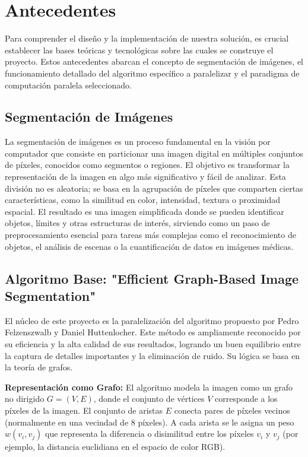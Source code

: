 \documentclass[fleqn,10pt]{article}
\begin{document}
\section{Antecedentes}
Para comprender el diseño y la implementación de nuestra solución, es crucial establecer las bases teóricas y tecnológicas sobre las cuales se construye el proyecto. Estos antecedentes abarcan el concepto de segmentación de imágenes, el funcionamiento detallado del algoritmo específico a paralelizar y el paradigma de computación paralela seleccionado.

\subsection{Segmentación de Imágenes}
La segmentación de imágenes es un proceso fundamental en la visión por computador que consiste en particionar una imagen digital en múltiples conjuntos de píxeles, conocidos como segmentos o regiones. El objetivo es transformar la representación de la imagen en algo más significativo y fácil de analizar. Esta división no es aleatoria; se basa en la agrupación de píxeles que comparten ciertas características, como la similitud en color, intensidad, textura o proximidad espacial. El resultado es una imagen simplificada donde se pueden identificar objetos, límites y otras estructuras de interés, sirviendo como un paso de preprocesamiento esencial para tareas más complejas como el reconocimiento de objetos, el análisis de escenas o la cuantificación de datos en imágenes médicas.

\subsection{Algoritmo Base: "Efficient Graph-Based Image Segmentation"}
El núcleo de este proyecto es la paralelización del algoritmo propuesto por Pedro Felzenszwalb y Daniel Huttenlocher. Este método es ampliamente reconocido por su eficiencia y la alta calidad de sus resultados, logrando un buen equilibrio entre la captura de detalles importantes y la eliminación de ruido. Su lógica se basa en la teoría de grafos.

\textbf{Representación como Grafo:} El algoritmo modela la imagen como un grafo no dirigido $G=(V,E)$, donde el conjunto de vértices $V$ corresponde a los píxeles de la imagen. El conjunto de aristas $E$ conecta pares de píxeles vecinos (normalmente en una vecindad de 8 píxeles). A cada arista se le asigna un peso $w(v_i, v_j)$ que representa la diferencia o disimilitud entre los píxeles $v_i$ y $v_j$ (por ejemplo, la distancia euclidiana en el espacio de color RGB).
\end{document}
